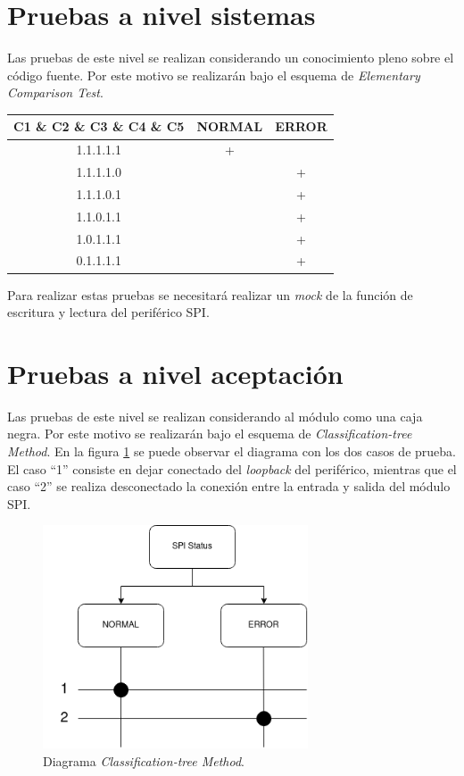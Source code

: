 \documentclass[
    11pt,
    spanish,
	a4paper
]{article}
\begin{document}
\section{Pruebas a nivel sistemas}
\label{sec:lvlsistema}

Las pruebas de este nivel se realizan considerando un conocimiento pleno sobre el código fuente.
Por este motivo se realizarán bajo el esquema de \emph{Elementary Comparison Test}.

\begin{table}[H]
	\centering
	\begin{tabular}{c|cc}
        C1 \& C2 \& C3 \& C4 \& C5 & NORMAL & ERROR \\ \hline
        1.1.1.1.1                  & +      &       \\
        1.1.1.1.0                  &        & +     \\
        1.1.1.0.1                  &        & +     \\
        1.1.0.1.1                  &        & +     \\
        1.0.1.1.1                  &        & +     \\
        0.1.1.1.1                  &        & +     \\
	\end{tabular}
\end{table}

Para realizar estas pruebas se necesitará realizar un \emph{mock} de la función de escritura y lectura del periférico SPI.

\section{Pruebas a nivel aceptación}
\label{sec:lvlaceptacion}

Las pruebas de este nivel se realizan considerando al módulo como una caja negra.
Por este motivo se realizarán bajo el esquema de \emph{Classification-tree Method}.
En la figura \ref{fig:ctm} se puede observar el diagrama con los dos casos de prueba.
El caso ``1'' consiste en dejar conectado del \emph{loopback} del periférico, mientras que el caso ``2'' se realiza desconectado la conexión entre la entrada y salida del módulo SPI.

\begin{figure}[h!]
	\centering
	\includegraphics[width=0.7\textwidth]{./img/ctm.png}
    \caption{Diagrama \emph{Classification-tree Method}.}
	\label{fig:ctm}
\end{figure}
\end{document}
